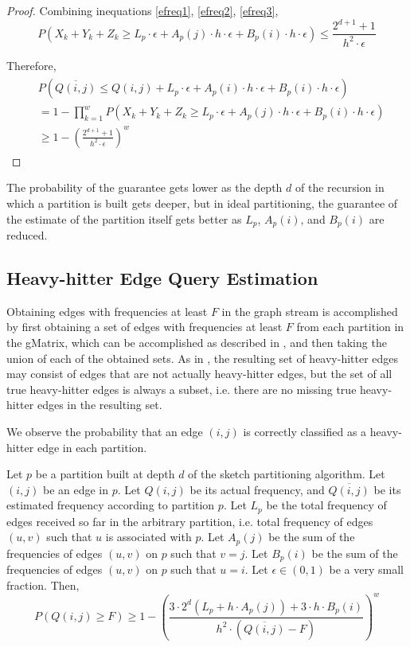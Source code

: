 \begin{proof}
Combining inequations \ref{efreq1}, \ref{efreq2}, \ref{efreq3},
\begin{equation} \label{efreq4}
  P(X_k + Y_k + Z_k \geq L_p \cdot \epsilon + A_p(j) \cdot h \cdot \epsilon + B_p(i) \cdot h \cdot \epsilon) \leq \frac{2^{d+1}+1}{h^2\cdot\epsilon}
\end{equation}

Therefore,
\begin{align}
\begin{split}
&  P(\overline{Q(i,j)} \leq Q(i,j) + L_p \cdot \epsilon + A_p(i) \cdot h \cdot \epsilon + B_p(i) \cdot h \cdot \epsilon)
\\  &= 1 - \prod _{k=1}^{w}P(X_k + Y_k + Z_k \geq L_p \cdot \epsilon + A_p(j) \cdot h \cdot \epsilon + B_p(i) \cdot h \cdot \epsilon)
\\  &\geq 1-(\frac{2^{d+1}+1}{h^2\cdot\epsilon})^w
\end{split}
\end{align}

\end{proof}

\begin{remarks}
  The probability of the guarantee gets lower as the depth $d$ of the recursion in which a partition is built gets deeper, but in ideal partitioning, the guarantee of the estimate of the partition itself gets better as $L_p$, $A_p(i)$, and $B_p(i)$ are reduced.
\end{remarks}


\subsection{Heavy-hitter Edge Query Estimation}
Obtaining edges with frequencies at least $F$ in the graph stream is accomplished by first obtaining a set of edges with frequencies at least $F$ from each partition in the gMatrix, which can be accomplished as described in \cite{khan}, and then taking the union of each of the obtained sets. As in \cite{khan}, the resulting set of heavy-hitter edges may consist of edges that are not actually heavy-hitter edges, but the set of all true heavy-hitter edges is always a subset, i.e. there are no missing true heavy-hitter edges in the resulting set.

We observe the probability that an edge $(i,j)$ is correctly classified as a heavy-hitter edge in each partition.

\begin{theorem}
Let $p$ be a partition built at depth $d$ of the sketch partitioning algorithm. Let $(i,j)$ be an edge in $p$. Let $Q(i,j)$ be its actual frequency, and $\overline{Q(i,j)}$ be its estimated frequency according to partition $p$. Let $L_p$ be the total frequency of edges received so far in the arbitrary partition, i.e. total frequency of edges $(u,v)$ such that $u$ is associated with $p$. Let $A_p(j)$ be the sum of the frequencies of edges $(u,v)$ on $p$ such that $v=j$. Let $B_p(i)$ be the sum of the frequencies of edges $(u,v)$ on $p$ such that $u=i$. Let $\epsilon \in (0,1)$ be a very small fraction. Then,
\[
P(Q(i,j) \geq F) \geq 1-(\frac{3\cdot2^d(L_p+h\cdot A_p(j)) + 3\cdot h\cdot B_p(i)}{h^2\cdot (\overline{Q(i,j)}-F)})^w
\]
\end{theorem}

